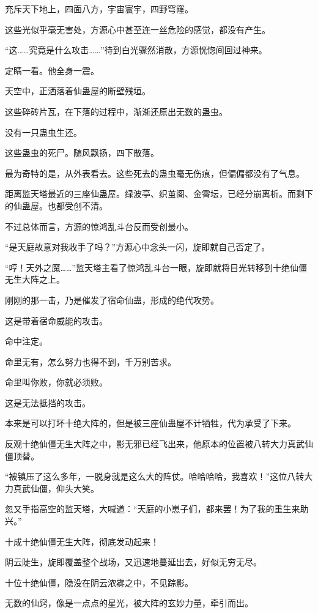 \begin{this_body}
充斥天下地上，四面八方，宇宙寰宇，四野穹窿。

这些光似乎毫无害处，方源心中甚至连一丝危险的感觉，都没有产生。

“这……究竟是什么攻击……”待到白光骤然消散，方源恍惚间回过神来。

定睛一看。他全身一震。

天空中，正洒落着仙蛊屋的断壁残垣。

这些碎砖片瓦，在下落的过程中，渐渐还原出无数的蛊虫。

没有一只蛊虫生还。

这些蛊虫的死尸。随风飘扬，四下散落。

最为奇特的是，从外表看去。这些死去的蛊虫毫无伤痕，但偏偏都没有了气息。

距离监天塔最近的三座仙蛊屋。绿波亭、织茧阁、金霄坛，已经分崩离析。而剩下的仙蛊屋。也都受创不清。

不过总体而言，方源的惊鸿乱斗台反而受创最小。

“是天庭故意对我收手了吗？”方源心中念头一闪，旋即就自己否定了。

“哼！天外之魔……”监天塔主看了惊鸿乱斗台一眼，旋即就将目光转移到十绝仙僵无生大阵之上。

刚刚的那一击，乃是催发了宿命仙蛊，形成的绝代攻势。

这是带着宿命威能的攻击。

命中注定。

命里无有，怎么努力也得不到，千万别苦求。

命里叫你败，你就必须败。

这是无法抵挡的攻击。

本来是可以打坏十绝大阵的，但是被三座仙蛊屋不计牺牲，代为承受了下来。

反观十绝仙僵无生大阵之中，影无邪已经飞出来，他原本的位置被八转大力真武仙僵顶替。

“被镇压了这么多年，一脱身就是这么大的阵仗。哈哈哈哈，我喜欢！”这位八转大力真武仙僵，仰头大笑。

忽又手指高空的监天塔，大喊道：“天庭的小崽子们，都来罢！为了我的重生来助兴。”

十成十绝仙僵无生大阵，彻底发动起来！

阴云陡生，旋即覆盖整个战场，又迅速地蔓延出去，好似无穷无尽。

十位十绝仙僵，隐没在阴云浓雾之中，不见踪影。

无数的仙窍，像是一点点的星光，被大阵的玄妙力量，牵引而出。


\end{this_body}

